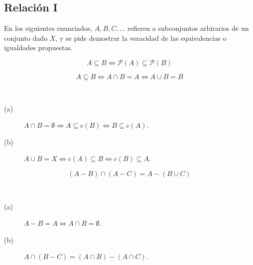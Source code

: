 \subsection{Relación I}
En los siguientes enunciados, $A, B, C, \ldots$ refieren a subconjuntos arbirarios de un conjunto dado $X$, y se pide demostrar la veracidad de las equivalencias o igualdades propuestas.

\begin{ejercicio}
    \begin{equation*}
        A \subseteq B \Longleftrightarrow \mathcal{P}(A) \subseteq \mathcal{P}(B)
    \end{equation*}
\end{ejercicio}

\begin{ejercicio}
    \begin{equation*}
        A \subseteq B \Longleftrightarrow A \cap B = A \Longleftrightarrow A \cup B = B
    \end{equation*}    
\end{ejercicio}

\begin{ejercicio}
    \ 
    \begin{description}
        \item [(a)] $A\cap B = \emptyset \Longleftrightarrow A \subseteq c(B) \Longleftrightarrow B\subseteq c(A)$.
        \item [(b)] $A\cup B = X \Longleftrightarrow c(A) \subseteq B \Longleftrightarrow c(B)\subseteq A$.
    \end{description}
\end{ejercicio}

\begin{ejercicio}
    \begin{equation*}
        (A-B)\cap(A-C) = A-(B\cup C)
    \end{equation*}
\end{ejercicio}

\begin{ejercicio}
    \ 
    \begin{description}
        \item [(a)] $A-B=A\Longleftrightarrow A\cap B = \emptyset $.
        \item [(b)] $A\cap(B-C) = (A\cap B) - (A \cap C)$.
    \end{description}
\end{ejercicio}

